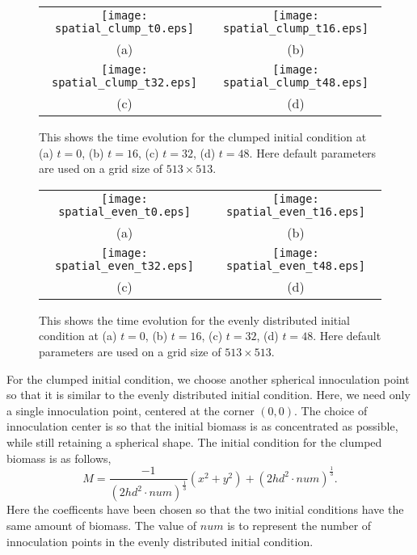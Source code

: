 \begin{figure}
  \centering 
  \begin{tabular}{c c}
    \texttt{[image: spatial\_clump\_t0.eps]} &
    \texttt{[image: spatial\_clump\_t16.eps]} \\
    (a) & (b) \\
    \texttt{[image: spatial\_clump\_t32.eps]} &
    \texttt{[image: spatial\_clump\_t48.eps]} \\
    (c) & (d) 
  \end{tabular}
  \caption{This shows the time evolution for the clumped initial condition at (a) $t=0$, (b) $t=16$, (c) $t=32$, (d) $t=48$.
    Here default parameters are used on a grid size of $513 \times 513$.
    }
  \label{fig:spatial_clump}
\end{figure}

\begin{figure}
  \centering 
  \begin{tabular}{c c}
    \texttt{[image: spatial\_even\_t0.eps]} &
    \texttt{[image: spatial\_even\_t16.eps]} \\
    (a) & (b) \\
    \texttt{[image: spatial\_even\_t32.eps]} &
    \texttt{[image: spatial\_even\_t48.eps]} \\
    (c) & (d) 
  \end{tabular}
  \caption{This shows the time evolution for the evenly distributed initial condition at (a) $t=0$, (b) $t=16$, (c) $t=32$, (d) $t=48$.
    Here default parameters are used on a grid size of $513 \times 513$.
    }
  \label{fig:spatial_even}
\end{figure}
For the clumped initial condition, we choose another spherical innoculation point so that it is similar to the evenly distributed initial condition.
Here, we need only a single innoculation point, centered at the corner $(0,0)$.
The choice of innoculation center is so that the initial biomass is as concentrated as possible, while still retaining a spherical shape.
The initial condition for the clumped biomass is as follows, 
\begin{equation}
M = \frac{-1}{(2hd^2\cdot num)^{\frac{1}{3}}} (x^2 + y^2) + (2hd^2\cdot num)^{\frac{1}{3}}.
\end{equation}
Here the coefficents have been chosen so that the two initial conditions have the same amount of biomass.
The value of $num$ is to represent the number of innoculation points in the evenly distributed initial condition.


